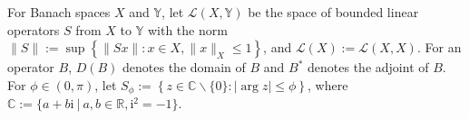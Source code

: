 \documentclass[onecolumn]{autart}
\newenvironment{proof of Prop.ODE}{{\it Proof of Proposition~\ref{Prop.ODE}:\enspace}}{\hfill $\blacksquare$\par}
\newenvironment{proof of PDE}{{\it Proof of Proposition \ref{Prop.8}:\enspace}}{\hfill $\blacksquare$\par}
\begin{document}
{	%
	For Banach spaces $X$ and $\mathbb{Y}$, let ${\mathscr{L}}( X ,\mathbb{Y})$ be  the space of  bounded linear operators $S$ from $ X $ to $\mathbb{Y}$   with the  norm $\|S\|:=\sup\left\{\|Sx\|:x\in X ,\|x\| _{ X }\leq1\right\}$, and ${\mathscr{L}}( X ):={\mathscr{L}}( X , X )$.
	For an operator {$B$,   $D(B)$ denotes the domain of $B$ and  $B^{*} $ denotes the adjoint of $B$. For $\phi\in (0,\pi)$, let  $S_\phi:=\left\{z\in \mathbb{C}\backslash \{0\}:|\arg z|\leq \phi\right\}$, where $\mathbb{C}:=\big\{a+b\text{i}~\big|~a,b\in \mathbb{R}, \text{i}^2=-1\big\}$.}
}
\end{document}
